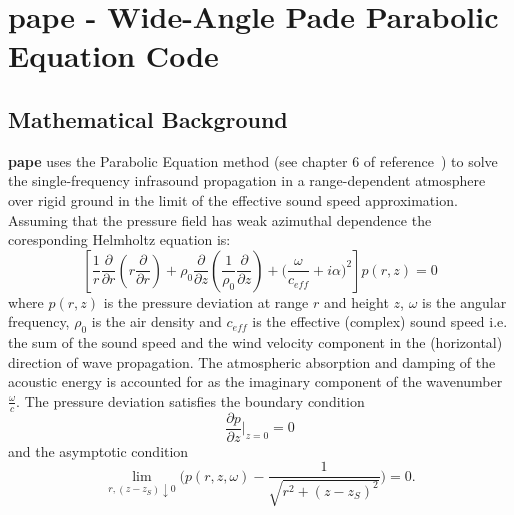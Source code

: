 
\section{pape - Wide-Angle Pade Parabolic Equation Code}
\label{sec: pape}

\subsection{Mathematical Background}
{\bf pape} uses the Parabolic Equation method (see chapter 6 of reference~\cite{comp_oc_ac}) to solve the single-frequency infrasound propagation in a range-dependent atmosphere over rigid ground in the limit of the effective sound speed approximation. Assuming that the pressure field has weak azimuthal dependence the coresponding Helmholtz equation is:
\[
\left[ \frac{1}{r} \frac{\partial}{\partial r} \left( r \frac{\partial}{\partial r} \right) 
+ 
\rho_0 \frac{\partial}{\partial z} \left( \frac{1}{\rho_0} \frac{\partial}{\partial z} \right) 
+ 
\Big(\frac{\omega}{c_{eff}}+i\alpha\Big)^2\right] p(r,z) 
= 
0
\]
where \( p(r,z) \) is the pressure deviation at range \(r\) and height \( z \), \(\omega \) is the angular frequency,  \(\rho_0 \) is the air density and \(c_{eff}\) is the effective (complex) sound speed i.e. the sum of the sound speed and the wind velocity component in the (horizontal) direction of wave propagation. The atmospheric absorption and damping of the acoustic energy is accounted for as the imaginary component of the wavenumber $\frac{\omega}{c}$. The pressure deviation satisfies the boundary condition 
\[
\frac {\partial p}{\partial z}\Big |_{z=0}= 0
\]
and the asymptotic condition 
\[
\lim_{r,(z-z_S)\downarrow0}\Big(p(r,z,\omega)-\frac{1}{\sqrt{r^2+(z-z_S)^2}}\Big)=0.
\]

